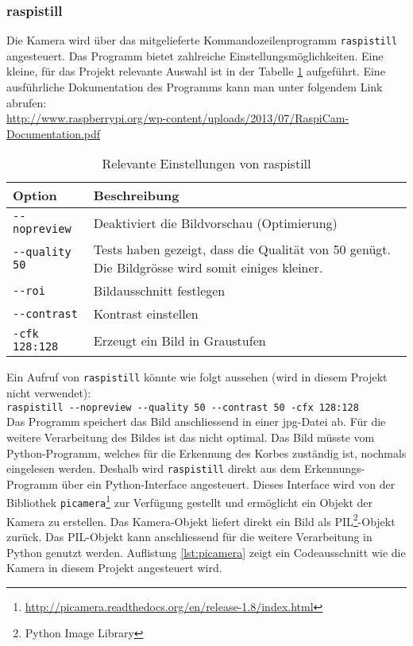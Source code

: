 \subsubsection{raspistill}
\label{subsub:raspistill}
Die Kamera wird über das mitgelieferte Kommandozeilenprogramm \verb|raspistill| angesteuert. Das Programm bietet zahlreiche Einstellungsmöglichkeiten. Eine kleine, für das Projekt relevante Auswahl ist in der Tabelle \ref{tab:raspistill} aufgeführt. Eine ausführliche Dokumentation des Programms kann man unter folgendem Link abrufen: \\

\href{http://www.raspberrypi.org/wp-content/uploads/2013/07/RaspiCam-Documentation.pdf}{http://www.raspberrypi.org/wp-content/uploads/2013/07/RaspiCam-Documentation.pdf} \\

\begin{table}[h!]
	\renewcommand{\arraystretch}{1.5}
	\begin{tabular}{|l|p{14cm}|}
		\hline Option & Beschreibung \\ 
		\hline \verb|--nopreview| & Deaktiviert die Bildvorschau (Optimierung) \\ 
		\hline  \verb|--quality 50| & Tests haben gezeigt, dass die Qualität von 50 genügt. Die Bildgrösse wird somit einiges kleiner. \\ 
		\hline  \verb|--roi| & Bildausschnitt festlegen \\ 
		\hline  \verb|--contrast| & Kontrast einstellen \\ 
		\hline  \verb|-cfk 128:128| & Erzeugt ein Bild in Graustufen \\ 
		\hline 
	\end{tabular} 
	\caption{Relevante Einstellungen von raspistill}
	\label{tab:raspistill}
\end{table}

Ein Aufruf von \verb|raspistill| könnte wie folgt aussehen (wird in diesem Projekt nicht verwendet): \\

\verb|raspistill --nopreview --quality 50 --contrast 50 -cfx 128:128| \\

Das Programm speichert das Bild anschliessend in einer jpg-Datei ab. Für die weitere Verarbeitung des Bildes ist das nicht optimal. Das Bild müsste vom Python-Programm, welches für die Erkennung des Korbes zuständig ist, nochmals eingelesen werden. Deshalb wird \verb|raspistill| direkt aus dem Erkennungs-Programm über ein Python-Interface angesteuert. Dieses Interface wird von der Bibliothek \verb|picamera|\footnote{\href{http://picamera.readthedocs.org/en/release-1.8/index.html}{http://picamera.readthedocs.org/en/release-1.8/index.html}} zur Verfügung gestellt und ermöglicht ein Objekt der Kamera zu erstellen. Das Kamera-Objekt liefert direkt ein Bild als PIL\footnote{Python Image Library}-Objekt zurück. Das PIL-Objekt kann anschliessend für die weitere Verarbeitung in Python genutzt werden. Auflistung \ref{lst:picamera} zeigt ein Codeausschnitt wie die Kamera in diesem Projekt angesteuert wird.

